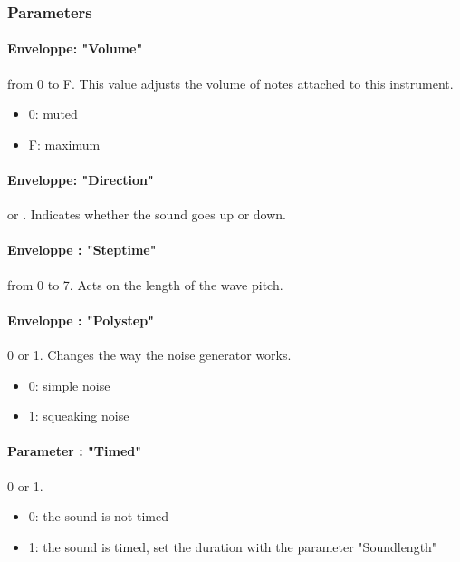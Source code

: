 
\subsubsection{Parameters}

\paragraph{Enveloppe: "Volume"} from 0 to F.
This value adjusts the volume of notes attached to this instrument.
\medskip

\begin{itemize}
    \item{0: muted}
    \item{F: maximum}
\end{itemize}

\paragraph{Enveloppe: "Direction"}  or .
Indicates whether the sound goes up or down.

\paragraph{Enveloppe : "Steptime"} from 0 to 7.
Acts on the length of the wave pitch.
\medskip

\paragraph{Enveloppe : "Polystep"} 0 or 1.
Changes the way the noise generator works.
\medskip

\begin{itemize}
    \item{0: simple noise}
    \item{1: squeaking noise}
\end{itemize}

\paragraph{Parameter : "Timed"} 0 or 1.
\medskip

\begin{itemize}
    \item{0: the sound is not timed}
    \item{1: the sound is timed, set the duration with the parameter "Soundlength"}
\end{itemize}

